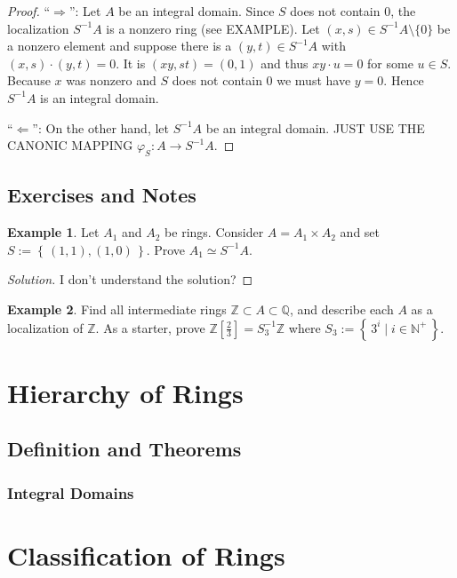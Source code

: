 \documentclass[a4paper]{book}
\theoremstyle{definition}
\newtheorem{example}{Example}[definition]
\newcommand{\set}[1]{\left\{\, #1 \,\right\}}
\newcommand{\makeset}[2]{\left\{\, #1 \mid #2 \,\right\}}
\begin{document}
\begin{proof}
    ``\(\Rightarrow\)'': Let \(A\) be an integral domain. Since \(S\) does not contain \(0\), the localization \(S^{-1}A\) is a nonzero ring (see EXAMPLE). Let \((x, s) \in S^{-1}A \setminus \{0\}\) be a nonzero element and suppose there is a \((y, t) \in S^{-1}A\) with \((x, s) \cdot (y, t) = 0\). It is \((xy, st) = (0, 1)\) and thus \(xy \cdot u = 0\) for some \(u \in S\). Because \(x\) was nonzero and \(S\) does not contain \(0\) we must have \(y = 0\). Hence \(S^{-1}A\) is an integral domain.

    ``\(\Leftarrow\)'': On the other hand, let \(S^{-1}A\) be an integral domain. JUST USE THE CANONIC MAPPING \(\varphi_S: A \longrightarrow S^{-1}A\).
\end{proof}

\section{Exercises and Notes}

\begin{example}
    Let \(A_1\) and \(A_2\) be rings. Consider \(A = A_1 \times A_2\) and set \(S := \set{(1, 1), (1, 0)}\). Prove \(A_1 \simeq S^{-1}A\).
\end{example}

\begin{proof}[Solution]
    I don't understand the solution?
\end{proof}


\begin{example}
    Find all intermediate rings \(\mathbb{Z} \subset A \subset \mathbb{Q}\), and describe each \(A\) as a localization of \(\mathbb{Z}\). As a starter, prove \(\mathbb{Z}\left[\frac{2}{3}\right] = S_3^{-1} \mathbb{Z}\) where \(S_3 := \makeset{3^i}{i \in \mathbb{N}^+}\).
\end{example}

\chapter{Hierarchy of Rings}
\section{Definition and Theorems}
\subsection{Integral Domains}

\chapter{Classification of Rings}
\end{document}
